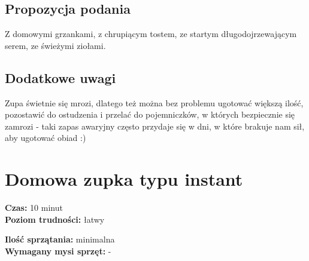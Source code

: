 \documentclass[a4paper,10pt]{book}
\begin{document}
\vspace{0.5cm} 

\small
\subsection*{Propozycja podania}
Z domowymi grzankami, z chrupiącym tostem, ze startym długodojrzewającym serem, ze świeżymi ziołami.

\vspace{0.3cm}

\subsection*{Dodatkowe uwagi}
Zupa świetnie się mrozi, dlatego też można bez problemu ugotować większą ilość, pozostawić do ostudzenia i przelać do pojemniczków, w których bezpiecznie się zamrozi - taki zapas awaryjny często przydaje się w dni, w które brakuje nam sił, aby ugotować obiad :)

\newpage 

\section{Domowa zupka typu instant}
\bigskip
\small
\begin{minipage}{0.45\textwidth}
    \noindent \textbf{Czas:} 10 minut \\
    \textbf{Poziom trudności:} łatwy
\end{minipage}
\begin{minipage}{0.45\textwidth}
    \noindent \textbf{Ilość sprzątania:} minimalna\\
    \textbf{Wymagany mysi sprzęt:} -
\end{minipage}
\normalsize
\vspace{0.5cm}
\end{document}

